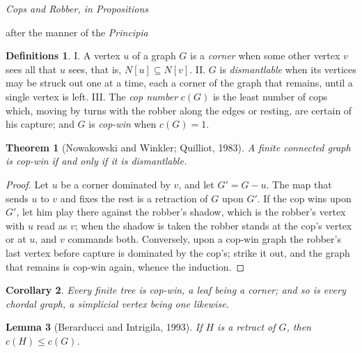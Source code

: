 \documentclass[11pt]{article}
\theoremstyle{plain}
\newtheorem{Theorem}{Theorem}
\newtheorem{Lemma}[Theorem]{Lemma}
\newtheorem{Corollary}[Theorem]{Corollary}
\theoremstyle{definition}
\newtheorem*{Definition}{Definitions}
\theoremstyle{remark}
\begin{document}
\begin{center}
  {\small{}}\par
  \vspace{0.3em}
  {\Large\itshape Cops and Robber, in Propositions}\par
  \vspace{0.3em}
  {\footnotesize after the manner of the \textit{Principia}}
\end{center}

\vspace{0.6em}

\begin{Definition}
I. A vertex $u$ of a graph $G$ is a \emph{corner} when some other vertex
$v$ sees all that $u$ sees, that is, $N[u] \subseteq N[v]$.
II. $G$ is \emph{dismantlable} when its vertices may be struck out one at
a time, each a corner of the graph that remains, until a single vertex is
left.
III. The \emph{cop number} $c(G)$ is the least number of cops which,
moving by turns with the robber along the edges or resting, are certain
of his capture; and $G$ is \emph{cop-win} when $c(G) = 1$.
\end{Definition}

\begin{Theorem}[Nowakowski and Winkler; Quilliot, 1983]
A finite connected graph is cop-win if and only if it is dismantlable.
\end{Theorem}

\begin{proof}
Let $u$ be a corner dominated by $v$, and let $G' = G - u$. The map that
sends $u$ to $v$ and fixes the rest is a retraction of $G$ upon $G'$. If
the cop wins upon $G'$, let him play there against the robber's shadow,
which is the robber's vertex with $u$ read as $v$; when the shadow is
taken the robber stands at the cop's vertex or at $u$, and $v$ commands
both. Conversely, upon a cop-win graph the robber's last vertex before
capture is dominated by the cop's; strike it out, and the graph that
remains is cop-win again, whence the induction.
\end{proof}

\begin{Corollary}
Every finite tree is cop-win, a leaf being a corner; and so is every
chordal graph, a simplicial vertex being one likewise.
\end{Corollary}

\begin{Lemma}[Berarducci and Intrigila, 1993]
If $H$ is a retract of $G$, then $c(H) \le c(G)$.
\end{Lemma}
\end{document}
